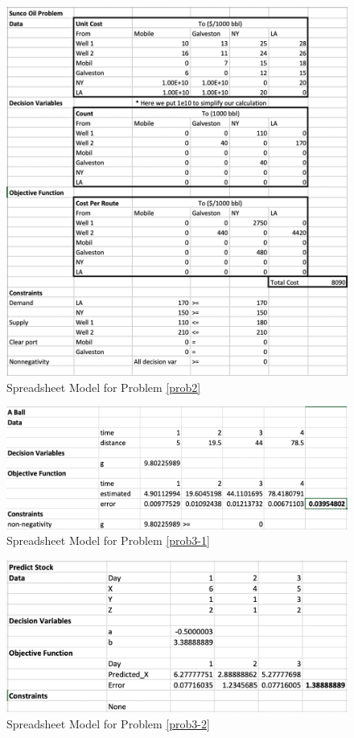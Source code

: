 \begin{figure}
    \centering
    \includegraphics[width=\textwidth]{hw1/hw1-prob2.png}
    \caption{Spreadsheet Model for Problem \ref{prob2}}
    \label{fig:my_label}
\end{figure}

\begin{figure}
    \centering
    \includegraphics[width=\textwidth]{hw1/hw1-prob3-1.png}
    \caption{Spreadsheet Model for Problem \ref{prob3-1}}
    \label{fig:my_label}
\end{figure}

\begin{figure}
    \centering
    \includegraphics[width=\textwidth]{hw1/hw1-prob3-2.png}
    \caption{Spreadsheet Model for Problem \ref{prob3-2}}
    \label{fig:my_label}
\end{figure}

